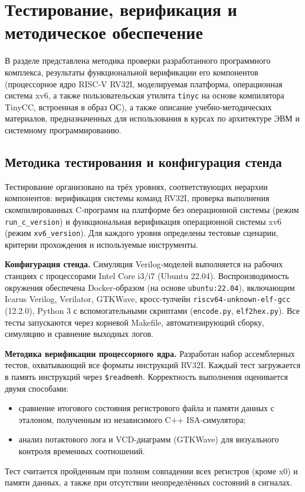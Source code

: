 
\section{Тестирование, верификация и методическое обеспечение}
\label{sec:testing}

В разделе представлена методика проверки разработанного программного комплекса, результаты функциональной верификации его компонентов (процессорное ядро RISC‑V RV32I, моделируемая платформа, операционная система xv6, а также пользовательская утилита \texttt{tinyc} на основе компилятора TinyCC, встроенная в образ ОС), а также описание учебно‑методических материалов, предназначенных для использования в курсах по архитектуре ЭВМ и системному программированию.

\subsection{Методика тестирования и конфигурация стенда}

Тестирование организовано на трёх уровнях, соответствующих иерархии компонентов: верификация системы команд RV32I, проверка выполнения скомпилированных C‑программ на платформе без операционной системы (режим \texttt{run\_c\_version}) и функциональная верификация операционной системы xv6 (режим \texttt{xv6\_version}). Для каждого уровня определены тестовые сценарии, критерии прохождения и используемые инструменты.

\textbf{Конфигурация стенда.} Симуляция Verilog‑моделей выполняется на рабочих станциях с процессорами Intel Core i3/i7 (Ubuntu 22.04). Воспроизводимость окружения обеспечена Docker‑образом (на основе \texttt{ubuntu:22.04}), включающим Icarus Verilog, Verilator, GTKWave, кросс‑тулчейн \texttt{riscv64-unknown-elf-gcc} (12.2.0), Python 3 с вспомогательными скриптами (\texttt{encode.py}, \texttt{elf2hex.py}). Все тесты запускаются через корневой Makefile, автоматизирующий сборку, симуляцию и сравнение выходных логов.

\textbf{Методика верификации процессорного ядра.} Разработан набор ассемблерных тестов, охватывающий все форматы инструкций RV32I. Каждый тест загружается в память инструкций через \texttt{\$readmemh}. Корректность выполнения оценивается двумя способами:
\begin{itemize}
\item сравнение итогового состояния регистрового файла и памяти данных с эталоном, полученным из независимого C++ ISA‑симулятора;
\item анализ потактового лога и VCD‑диаграмм (GTKWave) для визуального контроля временных соотношений.
\end{itemize}
Тест считается пройденным при полном совпадении всех регистров (кроме x0) и памяти данных, а также при отсутствии неопределённых состояний в сигналах.

